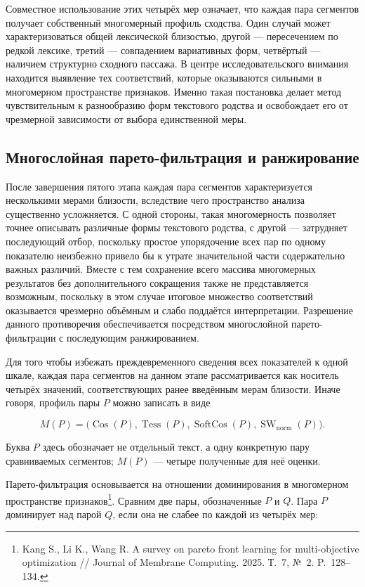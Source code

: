 Совместное использование этих четырёх мер означает, что каждая пара сегментов получает собственный многомерный профиль сходства. Один случай может характеризоваться общей лексической близостью, другой --- пересечением по редкой лексике, третий --- совпадением вариативных форм, четвёртый --- наличием структурно сходного пассажа. В центре исследовательского внимания находится выявление тех соответствий, которые оказываются сильными в многомерном пространстве признаков. Именно такая постановка делает метод чувствительным к разнообразию форм текстового родства и освобождает его от чрезмерной зависимости от выбора единственной меры.

\subsection{Многослойная парето-фильтрация и ранжирование}

После завершения пятого этапа каждая пара сегментов характеризуется несколькими мерами близости, вследствие чего пространство анализа существенно усложняется. С одной стороны, такая многомерность позволяет точнее описывать различные формы текстового родства, с другой --- затрудняет последующий отбор, поскольку простое упорядочение всех пар по одному показателю неизбежно привело бы к утрате значительной части содержательно важных различий. Вместе с тем сохранение всего массива многомерных результатов без дополнительного сокращения также не представляется возможным, поскольку в этом случае итоговое множество соответствий оказывается чрезмерно объёмным и слабо поддаётся интерпретации. Разрешение данного противоречия обеспечивается посредством многослойной парето-фильтрации с последующим ранжированием.

Для того чтобы избежать преждевременного сведения всех показателей к одной шкале, каждая пара сегментов на данном этапе рассматривается как носитель четырёх значений, соответствующих ранее введённым мерам близости. Иначе говоря, профиль пары $P$ можно записать в виде

\begin{equation}
M(P)=\bigl(\operatorname{Cos}(P),\operatorname{Tess}(P),
\operatorname{SoftCos}(P),\operatorname{SW}_{\mathrm{norm}}(P)\bigr).
\end{equation}

Буква $P$ здесь обозначает не отдельный текст, а одну конкретную пару сравниваемых сегментов; $M(P)$ --- четыре полученные для неё оценки.

Парето-фильтрация основывается на отношении доминирования в многомерном пространстве признаков\footnote{Kang S., Li K., Wang R. A survey on pareto front learning for multi-objective optimization // Journal of Membrane Computing. 2025. Т.~7, №~2. P.~128--134.}. Сравним две пары, обозначенные $P$ и $Q$. Пара $P$ доминирует над парой $Q$, если она не слабее по каждой из четырёх мер:


